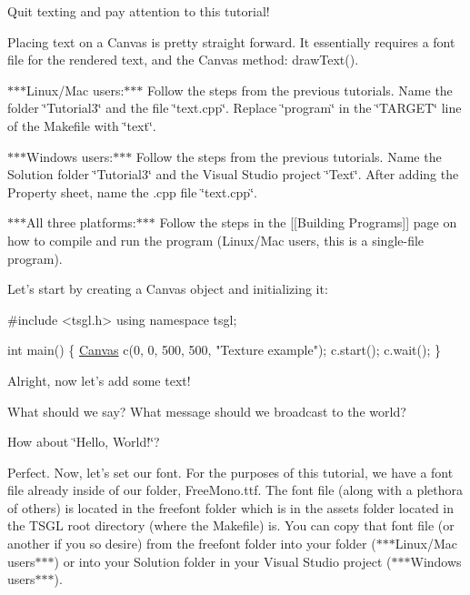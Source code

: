 Quit texting and pay attention to this tutorial!

Placing text on a Canvas is pretty straight forward. It essentially requires a font file for the rendered text, and the Canvas method\-: {\ttfamily draw\-Text()}.

$\ast$$\ast$$\ast$\-Linux/\-Mac users\-:$\ast$$\ast$$\ast$ Follow the steps from the previous tutorials. Name the folder \char`\"{}\-Tutorial3\char`\"{} and the file \char`\"{}text.\-cpp\char`\"{}. Replace \char`\"{}program\char`\"{} in the \char`\"{}\-T\-A\-R\-G\-E\-T\char`\"{} line of the Makefile with \char`\"{}text\char`\"{}.

$\ast$$\ast$$\ast$\-Windows users\-:$\ast$$\ast$$\ast$ Follow the steps from the previous tutorials. Name the Solution folder \char`\"{}\-Tutorial3\char`\"{} and the Visual Studio project \char`\"{}\-Text\char`\"{}. After adding the Property sheet, name the .cpp file \char`\"{}text.\-cpp\char`\"{}.

$\ast$$\ast$$\ast$\-All three platforms\-:$\ast$$\ast$$\ast$ Follow the steps in the \mbox{[}\mbox{[}Building Programs\mbox{]}\mbox{]} page on how to compile and run the program (Linux/\-Mac users, this is a single-\/file program).

Let's start by creating a Canvas object and initializing it\-:


\begin{DoxyCode}
\textcolor{preprocessor}{#include <tsgl.h>}
\textcolor{keyword}{using namespace }tsgl;

\textcolor{keywordtype}{int} main() \{
  \hyperlink{classtsgl_1_1_canvas}{Canvas} c(0, 0, 500, 500, \textcolor{stringliteral}{"Texture example"});
  c.start();
  c.wait();
\}
\end{DoxyCode}


Alright, now let's add some text!

What should we say? What message should we broadcast to the world?

How about \char`\"{}\-Hello, World!\char`\"{}?

Perfect. Now, let's set our font. For the purposes of this tutorial, we have a font file already inside of our folder, {\ttfamily Free\-Mono.\-ttf}. The font file (along with a plethora of others) is located in the {\ttfamily freefont} folder which is in the {\ttfamily assets} folder located in the T\-S\-G\-L root directory (where the {\ttfamily Makefile}) is. You can copy that font file (or another if you so desire) from the {\ttfamily freefont} folder into your folder ($\ast$$\ast$$\ast$\-Linux/\-Mac users$\ast$$\ast$$\ast$) or into your Solution folder in your Visual Studio project ($\ast$$\ast$$\ast$\-Windows users$\ast$$\ast$$\ast$).

